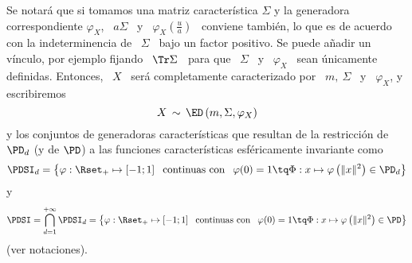 %
Se notar\'a que si tomamos  una matriz caracter\'istica $\Sigma$ y la generadora
correspondiente  $\varphi_X$, \ $a  \Sigma$ \  y \  $\varphi_X\left( \frac{u}{a}
\right)$ \ conviene tambi\'en, lo que  es de acuerdo con la indeterminencia de \
$\Sigma$ \ bajo un factor positivo.  Se puede a\~nadir un v\'inculo, por ejemplo
fijando  \  $\Tr \Sigma$  \  para  que  \ $\Sigma$  \  y  \ $\varphi_X$  \  sean
\'unicamente definidas. Entonces, \ $X$ \ ser\'a completamente caracterizado por
\ $m, \: \Sigma$ \ y \ $\varphi_X$, y escribiremos
%
\[
X \, \sim \, \ED \left( m , \Sigma , \varphi_X \right)
\]
%
y   los  conjuntos  de   generadoras  caracter\'isticas   que  resultan   de  la
restricci\'on  de  $\PD_d$  (y  de  $\PD$)  a  las  funciones  caracter\'isticas
esf\'ericamente invariante como
%
\[
\PDSI_d = \big\{  \varphi: \Rset_+ \mapsto [-1 ; 1] \:\:  \mbox{ continuas con }
\:\: \varphi(0)  = 1  \tq \Phi: x  \mapsto \varphi\left(  \| x \|^2  \right) \in
\PD_d \big\}
\]
%
y
%
\[
\PDSI = \bigcap_{d=1}^{+\infty} \PDSI_d =  \big\{ \varphi: \Rset_+ \mapsto [-1 ;
1]  \:\:  \mbox{ continuas  con  }  \:\: \varphi(0)  =  1  \tq  \Phi: x  \mapsto
\varphi\left( \| x \|^2 \right) \in \PD \big\}
\]
%
(ver notaciones).

